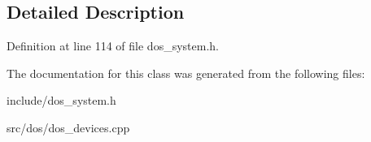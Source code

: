 \subsection{Detailed Description}


Definition at line 114 of file dos\-\_\-system.\-h.



The documentation for this class was generated from the following files\-:\begin{DoxyCompactItemize}
\item 
include/dos\-\_\-system.\-h\item 
src/dos/dos\-\_\-devices.\-cpp\end{DoxyCompactItemize}
